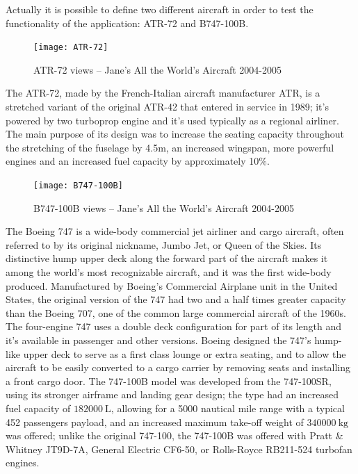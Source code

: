 \bigskip
\noindent
Actually it is possible to define two different aircraft in order to test the functionality of the application: ATR-72 and B747-100B.
%
\begin{figure}[!t]
\centering
\texttt{[image: ATR-72]}
\caption{ATR-72 views – Jane's All the World's Aircraft 2004-2005\cite{janes}}
\label{fig:Figure6}
\end{figure}

\bigskip
\noindent
The ATR-72, made by the French-Italian aircraft manufacturer ATR, is a stretched variant of the original ATR-42 that entered in service in 1989; it’s powered by two turboprop engine and it’s used typically as a regional airliner. The main purpose of its design was to increase the seating capacity throughout the stretching of the fuselage by 4.5m, an increased wingspan, more powerful engines and an increased fuel capacity by approximately 10$\%$.\cite{wiki:atr72}
%
\begin{figure}[!b]
\centering
\texttt{[image: B747-100B]}
\caption{B747-100B views – Jane's All the World's Aircraft 2004-2005\cite{janes}}
\label{fig:Figure7}
\end{figure}

\bigskip
\noindent
The Boeing 747 is a wide-body commercial jet airliner and cargo aircraft, often referred to by its original nickname, Jumbo Jet, or Queen of the Skies. Its distinctive hump upper deck along the forward part of the aircraft makes it among the world's most recognizable aircraft, and it was the first wide-body produced. Manufactured by Boeing's Commercial Airplane unit in the United States, the original version of the 747 had two and a half times greater capacity than the Boeing 707, one of the common large commercial aircraft of the 1960s. The four-engine 747 uses a double deck configuration for part of its length and it’s available in passenger and other versions. Boeing designed the 747's hump-like upper deck to serve as a first class lounge or extra seating, and to allow the aircraft to be easily converted to a cargo carrier by removing seats and installing a front cargo door. The 747-100B model was developed from the 747-100SR, using its stronger airframe and landing gear design; the type had an increased fuel capacity of $\SI{182000}{\liter}$, allowing for a 5000 nautical mile range with a typical 452 passengers payload, and an increased maximum take-off weight of $\SI{340000}{\kilogram}$ was offered; unlike the original 747-100, the 747-100B was offered with Pratt \& Whitney JT9D-7A, General Electric CF6-50, or Rolls-Royce RB211-524 turbofan engines.\cite{wiki:b747}

